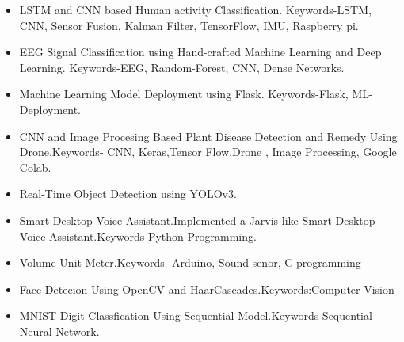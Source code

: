 \documentclass[10pt,a4paper,ragged2e]{altacv}
\begin{document}
\begin{itemize}
    \item LSTM and CNN based Human activity Classification. Keywords-LSTM, CNN, Sensor Fusion, Kalman Filter, TensorFlow, IMU, Raspberry pi.
    \item EEG Signal Classification using Hand-crafted Machine Learning and Deep Learning. Keywords-EEG, Random-Forest, CNN, Dense Networks.
        \item Machine Learning Model Deployment using Flask. Keywords-Flask, ML-Deployment.
    \item CNN and Image Procesing Based Plant Disease Detection and Remedy Using Drone.Keywords- CNN, Keras,Tensor Flow,Drone , Image Processing, Google Colab.
    \item Real-Time Object Detection using YOLOv3.
    \item Smart Desktop Voice Assistant.Implemented a Jarvis like Smart Desktop Voice Assistant.Keywords-Python Programming.
    \item Volume Unit Meter.Keywords- Arduino, Sound senor, C programming
    \item Face Detecion Using OpenCV and HaarCascades.Keywords:Computer Vision
    \item MNIST Digit Classfication Using Sequential Model.Keywords-Sequential Neural Network.
    
    
    
\end{itemize}
\end{document}

